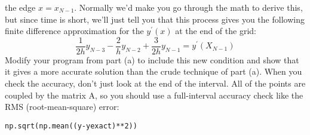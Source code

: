 \begin{problem}
\begin{enumerate}[label=(\alph*)]
the edge $x = x_{N−1}$. Normally we\rq d make you go through the math to
derive this, but since time is short, we\rq ll just tell you that this process
gives you the following finite difference approximation for the $y^\prime(x)$ at
the end of the grid:
	\begin{equation}\label{eq:210}
		\frac{1}{2h} y_{N-3} - \frac{2}{h} y_{N-2} + \frac{3}{2h} y_{N-1} = y^\prime(X_{N-1})
	\end{equation}
Modify your program from part (a) to include this new condition and
show that it gives a more accurate solution than the crude technique of
part (a). When you check the accuracy, don\rq t just look at the end of the
interval. All of the points are coupled by the matrix A, so you should
use a full-interval accuracy check like the RMS (root-mean-square)
error:
\begin{lstlisting}
np.sqrt(np.mean((y-yexact)**2))
\end{lstlisting}
\end{enumerate}
\end{problem}

